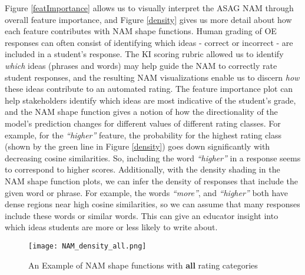 Figure \ref{featImportance} allows us to visually interpret the ASAG NAM through overall feature importance, and Figure \ref{density} gives us more detail about how each feature contributes with NAM shape functions. Human grading of OE responses can often consist of identifying which ideas - correct or incorrect - are included in a student's response. The KI scoring rubric allowed us to identify \textit{which} ideas (phrases and words) may help guide the NAM to correctly rate student responses, and the resulting NAM visualizations enable us to discern \textit{how} these ideas contribute to an automated rating. The feature importance plot can help stakeholders identify which ideas are most indicative of the student's grade, and the NAM shape function gives a notion of how the directionality of the model's prediction changes for different values of different rating classes. For example, for the \textit{“higher”} feature, the probability for the highest rating class (shown by the green line in Figure \ref{density}) goes down significantly with decreasing cosine similarities. So, including the word \textit{“higher”} in a response seems to correspond to higher scores. Additionally, with the density shading in the NAM shape function plots, we can infer the density of responses that include the given word or phrase. For example, the words \textit{“more”}, and \textit{“higher”} both have dense regions near high cosine similarities, so we can assume that many responses include these words or similar words. This can give an educator insight into which ideas students are more or less likely to write about.  

\begin{figure}
  \texttt{[image: NAM\_density\_all.png]}
  \caption{An Example of NAM shape functions with \textbf{all} rating categories}
  \label{shapeall}
\end{figure}

